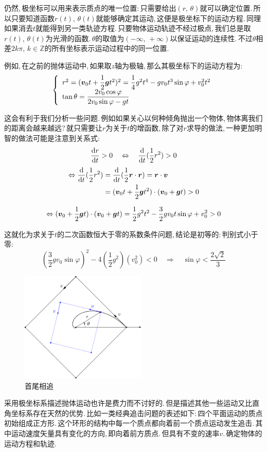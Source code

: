 仍然,\,极坐标可以用来表示质点的唯一位置:\,只需要给出$(r,\,\theta)$就可以确定位置.\,所以只要知道函数$r(t),\,\theta(t)$就能够确定其运动,\,这便是极坐标下的运动方程.\,同理如果消去$t$就能得到另一类轨迹方程.\,只要物体运动轨迹不经过极点,\,我们总是取$r(t),\,\theta(t)$为光滑的函数.\,$\theta$的取值为$(-\infty,\,+\infty)$以保证运动的连续性.\,不过$\theta$相差$2k\pi,\,k\in\mathbb{Z}$的所有坐标表示运动过程中的同一位置.

例如,\,在之前的抛体运动中,\,如果取$z$轴为极轴,\,那么其极坐标下的运动方程为:
\[\left\{\begin{array}{l} r^2=(\boldsymbol{v}_0 t+\dfrac{1}{2}\boldsymbol{g}t^2)^2=\dfrac{1}{4}g^2t^4  -gv_0t^3\sin\varphi + v_0^2t^2\\[3pt] \tan\theta=\dfrac{2v_0 \cos\varphi}{2v_0 \sin\varphi-gt}\end{array}\right.\]

这会有利于我们分析一些问题.\,例如如果关心以何种倾角抛出一个物体,\,物体离我们的距离会越来越远?\,就只需要让$r$为关于$t$的增函数,\,除了对$r$求导的做法,\,一种更加明智的做法可能是注意到关系式:
\[\frac{\textrm{d} r}{\textrm{d} t}>0  \quad\Leftrightarrow\quad	\frac{\textrm{d}}{\textrm{d} t}(\frac{1}{2}r^2)>0\]
\begin{align*} 
\Leftrightarrow \frac{\textrm{d}}{\textrm{d} t}(\frac{1}{2}r^2)	&=\frac{\textrm{d}}{\textrm{d} t}(\frac{1}{2}{\boldsymbol{r}\cdot\boldsymbol{r}})=\boldsymbol{r}\cdot\boldsymbol{v}\\
																			&=(\boldsymbol{v}_0 t+\dfrac{1}{2}\boldsymbol{g}t^2)\cdot(\boldsymbol{v}_0 +\boldsymbol{g}t)>0\\
\end{align*}

\[\Leftrightarrow (\boldsymbol{v}_0 +\dfrac{1}{2}\boldsymbol{g}t)\cdot(\boldsymbol{v}_0 +\boldsymbol{g}t)=\dfrac{1}{2}g^2t^2  -\dfrac{3}{2}gv_0t\sin\varphi + v_0^2>0\]

这就化为求关于$t$的二次函数恒大于零的系数条件问题,\,结论是初等的:\,判别式小于零:
\[\left(\dfrac{3}{2}gv_0\sin\varphi\right)^2-4\left(\dfrac{1}{2}g^2 \right)(v_0^2)<0\quad \Rightarrow\quad \sin\varphi<\frac{2\sqrt{2}}{3}\]

\begin{figure}\label{6-1-5}
\vspace{-0.4cm}
\centering
\includegraphics[width=6cm]{image/6-1-5.png}
\caption{首尾相追}
\end{figure}
采用极坐标系描述抛体运动也许是费力而不讨好的.\,但是描述其他一些运动又比直角坐标系存在天然的优势.\,比如一类经典追击问题的表述如下:\,四个平面运动的质点初始组成正方形.\,这个环形的结构中每一个质点都向着前一个质点运动发生追击.\,其中运动速度矢量具有变化的方向,\,即向着前方质点.\,但具有不变的速率$v$.\,确定物体的运动方程和轨迹.

